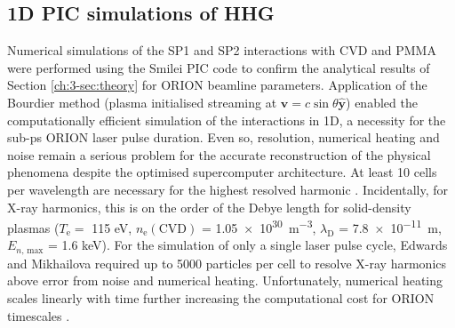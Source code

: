\subsection{1D PIC simulations of HHG}
Numerical simulations of the SP1 and SP2 interactions with CVD and PMMA were performed using the Smilei PIC code to confirm the analytical results of Section \ref{ch:3-sec:theory} for ORION beamline parameters. Application of the Bourdier method (plasma initialised streaming at $\mathbf{v}= c\sin\theta \mathbf{\hat{y}}$) enabled the computationally efficient simulation of the interactions in 1D, a necessity for the sub-ps ORION laser pulse duration. Even so, resolution, numerical heating and noise remain a serious problem for the accurate reconstruction of the physical phenomena despite the optimised supercomputer architecture. At least 10 cells per wavelength are necessary for the highest resolved harmonic \cite{edwardsXRayEmissionEffectiveness2020}. Incidentally, for X-ray harmonics, this is on the order of the Debye length for solid-density plasmas ($T_\mathrm{e} = $ 115 eV, $n_\mathrm{e}(\mathrm{CVD})$ = \qty{1.05e30}{m^{-3}}, $\lambda_\mathrm{D}$ = \qty{7.8e-11}{m}, $E_{n,\, \mathrm{max}}$ = 1.6 keV). For the simulation of only a single laser pulse cycle, Edwards and Mikhailova required up to 5000 particles per cell \cite{edwardsXRayEmissionEffectiveness2020} to resolve X-ray harmonics above error from noise and numerical heating. Unfortunately, numerical heating scales linearly with time further increasing the computational cost for ORION timescales \cite{arberContemporaryParticleincellApproach2015}.

